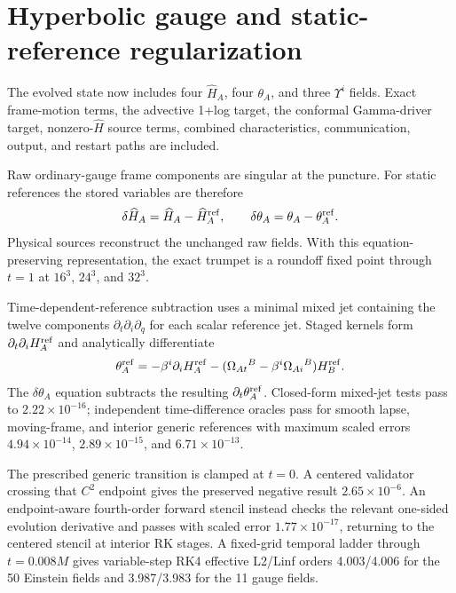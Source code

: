 \documentclass[11pt]{article}
\begin{document}
\section{Hyperbolic gauge and static-reference regularization}

The evolved state now includes four $\widehat H_A$, four $\theta_A$, and three
$\Upsilon^i$ fields.  Exact frame-motion terms, the advective 1+log target,
the conformal Gamma-driver target, nonzero-$\widehat H$ source terms, combined
characteristics, communication, output, and restart paths are included.

Raw ordinary-gauge frame components are singular at the puncture.  For static
references the stored variables are therefore
\begin{equation}
 \delta\widehat H_A=\widehat H_A-\widehat H^{\rm ref}_A,
 \qquad
 \delta\theta_A=\theta_A-\theta^{\rm ref}_A.
\end{equation}
Physical sources reconstruct the unchanged raw fields.  With this
equation-preserving representation, the exact trumpet is a roundoff fixed point
through $t=1$ at $16^3$, $24^3$, and $32^3$.

Time-dependent-reference subtraction uses a minimal mixed jet containing the
twelve components $\partial_t\partial_i\partial_q$ for each scalar reference
jet. Staged kernels form $\partial_t\partial_iH_A^{\rm ref}$ and analytically
differentiate
\begin{equation}
 \theta_A^{\rm ref}=-\beta^i\partial_iH_A^{\rm ref}
 -(\Omega_{At}{}^B-\beta^i\Omega_{Ai}{}^B)H_B^{\rm ref}.
\end{equation}
The $\delta\theta_A$ equation subtracts the resulting
$\partial_t\theta_A^{\rm ref}$. Closed-form mixed-jet tests pass to
$2.22\times10^{-16}$; independent time-difference oracles pass for smooth
lapse, moving-frame, and interior generic references with maximum scaled
errors $4.94\times10^{-14}$, $2.89\times10^{-15}$, and
$6.71\times10^{-13}$.

The prescribed generic transition is clamped at $t=0$. A centered validator
crossing that $C^2$ endpoint gives the preserved negative result
$2.65\times10^{-6}$. An endpoint-aware fourth-order forward stencil instead
checks the relevant one-sided evolution derivative and passes with scaled
error $1.77\times10^{-17}$, returning to the centered stencil at interior RK
stages. A fixed-grid temporal ladder through $t=0.008M$ gives variable-step
RK4 effective L2/Linf orders 4.003/4.006 for the 50 Einstein fields and
3.987/3.983 for the 11 gauge fields.
\end{document}
